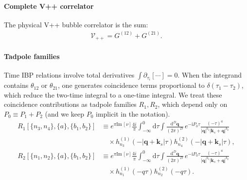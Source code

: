 \documentclass[a4paper,12pt]{article}
\newcommand{\FR}[2]{\displaystyle\frac{\,{#1}\,}{#2}}
\def\di{{\mathrm{d}}}
\def\mb{\mathbf}
\def\pd{\partial}
\def\ii{\mathrm{i}}
\def\Im{\mathrm{Im}\,}
\begin{document}
\paragraph{Complete V++ correlator}
The physical V++ bubble correlator is the sum:
\begin{align}
	\mathcal{V}_{++} = G^{(12)} + G^{(21)}.
\end{align}

\paragraph{Tadpole families} Time IBP relations involve total derivatives $\int \pd_{\tau_i}[\cdots]=0$. When the integrand contains $\theta_{12}$ or $\theta_{21}$, one generates coincidence terms proportional to $\delta(\tau_1-\tau_2)$, which reduce the two-time integral to a one-time integral. We treat these coincidence contributions as tadpole families $R_1,R_2$, which depend only on $P_0\equiv P_1+P_2$ (and we keep $P_0$ implicit in the notation).
\begin{align}
	R_1[\{n_3,n_4\},\{a\},\{b_1,b_2\}] & \equiv e^{\pi \Im [\nu]}\frac{4i}{\pi}\int_{-\infty}^0 \di\tau \int \FR{\di^D \mb q}{(2\pi)^D}\, e^{-\ii P_0\tau} \frac{(-\tau)^{a}}{|\mb q|^{b_1}|\mb k_s+\mb q|^{b_2}} \nonumber \\
	                                        & \quad\times h_{n_3}^{(1)}(-|\mb q+\mb k_s|\tau)h_{n_4}^{(2)}(-|\mb q+\mb k_s|\tau),                                                                                                                 \\
	R_2[\{n_1,n_2\},\{a\},\{b_1,b_2\}] & \equiv e^{\pi \Im [\nu]}\frac{4i}{\pi}\int_{-\infty}^0 \di\tau \int \FR{\di^D \mb q}{(2\pi)^D}\, e^{-\ii P_0\tau} \frac{(-\tau)^{a}}{|\mb q|^{b_1}|\mb k_s+\mb q|^{b_2}} \nonumber \\
	                                        & \quad\times h_{n_1}^{(1)}(-q\tau)h_{n_2}^{(2)}(-q\tau).
\end{align}
\end{document}
